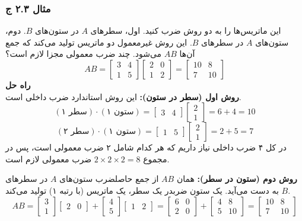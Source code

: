 \documentclass[12pt, a4paper]{book}
\begin{document}
	\subsubsection*{مثال ۲.۳ ج}
	این ماتریس‌ها را به دو روش ضرب کنید. اول، سطرهای $A$ در ستون‌های $B$. دوم، ستون‌های $A$ در سطرهای $B$. این روش غیرمعمول دو ماتریس تولید می‌کند که جمع آن‌ها $AB$ می‌شود. چند ضرب معمولی مجزا لازم است؟
	\[
	AB = \begin{bmatrix} 3 & 4 \\ 1 & 5 \end{bmatrix}
	\begin{bmatrix} 2 & 0 \\ 1 & 2 \end{bmatrix}
	=
	\begin{bmatrix} 10 & 8 \\ 7 & 10 \end{bmatrix}
	\]
	\textbf{راه حل} \\
	\textbf{روش اول (سطر در ستون):} این روش استاندارد ضرب داخلی است.
	\[ (\text{سطر ۱}) \cdot (\text{ستون ۱}) = \begin{bmatrix} 3 & 4 \end{bmatrix} \begin{bmatrix} 2 \\ 1 \end{bmatrix} = 6+4=10 \]
	\[ (\text{سطر ۲}) \cdot (\text{ستون ۱}) = \begin{bmatrix} 1 & 5 \end{bmatrix} \begin{bmatrix} 2 \\ 1 \end{bmatrix} = 2+5=7 \]
	در کل ۴ ضرب داخلی نیاز داریم که هر کدام شامل ۲ ضرب معمولی است، پس در مجموع $2 \times 2 \times 2 = 8$ ضرب معمولی لازم است.
	
	\textbf{روش دوم (ستون در سطر):} همان $AB$ از جمع حاصلضرب ستون‌های $A$ در سطرهای $B$ به دست می‌آید. یک ستون ضربدر یک سطر، یک ماتریس (با رتبه ۱) تولید می‌کند.
	\[
	AB = \begin{bmatrix} 3 \\ 1 \end{bmatrix} \begin{bmatrix} 2 & 0 \end{bmatrix} + \begin{bmatrix} 4 \\ 5 \end{bmatrix} \begin{bmatrix} 1 & 2 \end{bmatrix}
	= \begin{bmatrix} 6 & 0 \\ 2 & 0 \end{bmatrix} + \begin{bmatrix} 4 & 8 \\ 5 & 10 \end{bmatrix}
	= \begin{bmatrix} 10 & 8 \\ 7 & 10 \end{bmatrix}
	\]
	
\end{document}
